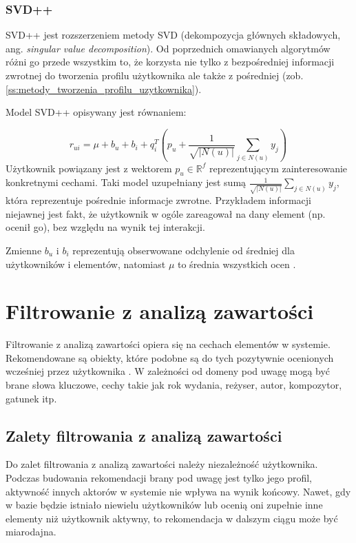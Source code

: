 \documentclass[twoside]{iisthesis}
\begin{document}
	 \subsubsection{SVD++}
	 
	 SVD++ jest rozszerzeniem metody SVD (dekompozycja głównych składowych, ang. \textit{singular value decomposition}). Od poprzednich omawianych algorytmów różni go przede wszystkim to, że korzysta nie tylko z bezpośredniej informacji zwrotnej do tworzenia profilu użytkownika ale także z pośredniej (zob. \ref{ss:metody_tworzenia_profilu_uzytkownika}).
	 
	 Model SVD++ opisywany jest równaniem:
	 
	 \begin{equation}
	 \label{eq:svd}
	 r_{ui} = \mu + b_u + b_i + q_i^T (p_u + \frac{1}{\sqrt{|N(u)|}} \sum_{j \in N(u)}^{} y_j) 
	 \,
	 \end{equation}		 		 
	 Użytkownik powiązany jest z wektorem $p_u \in \mathbb{R} ^f$ reprezentującym zainteresowanie konkretnymi cechami. Taki model uzupełniany jest sumą  $\frac{1}{\sqrt{|N(u)|}} \sum_{j \in N(u)}^{} y_j$, która reprezentuje pośrednie informacje zwrotne. Przykładem informacji niejawnej jest fakt, że użytkownik w ogóle zareagował na dany element (np. ocenił go), bez względu na wynik tej interakcji. 
	 
	 Zmienne $b_u$ i $b_i$ reprezentują obserwowane odchylenie od średniej dla użytkowników i elementów, natomiast $\mu$ to średnia wszystkich ocen \cite{koren2008factorization}. 
	 
	 \section{Filtrowanie z analizą zawartości}
	 \label{s:filtrowaniezanalizazawartosci}
	 
	 Filtrowanie z analizą zawartości opiera się na cechach elementów w systemie. Rekomendowane są obiekty, które podobne są do tych pozytywnie ocenionych wcześniej przez użytkownika \cite{id:huynh2012modeling}. W zależności od domeny pod uwagę mogą być brane słowa kluczowe, cechy takie jak rok wydania, reżyser, autor, kompozytor, gatunek itp.
	 
	 \subsection{Zalety filtrowania z analizą zawartości}
	 
	 Do zalet filtrowania z analizą zawartości należy niezależność użytkownika. Podczas budowania rekomendacji brany pod uwagę jest tylko jego profil, aktywność innych aktorów w systemie nie wpływa na wynik końcowy. Nawet, gdy w bazie będzie istniało niewielu użytkowników lub ocenią oni zupełnie inne elementy niż użytkownik aktywny, to rekomendacja w dalszym ciągu może być miarodajna. 
	 
\end{document}
